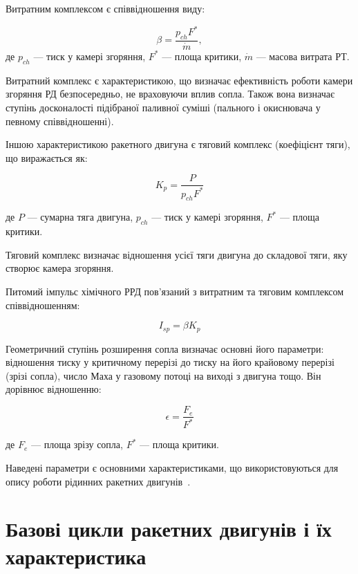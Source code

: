 Витратним комплексом є співвідношення виду:

\begin{equation*}
	\beta = \frac{p_{ch} F^{*}}{\dot{m}},
\end{equation*}
де  $p_{ch}$ ---  тиск у камері згоряння, $F^{*}$ ---  площа критики, $\dot{m}$ --- масова витрата РТ.

Витратний комплекс є характеристикою, що визначає ефективність роботи камери згоряння РД безпосередньо, не враховуючи вплив сопла. Також вона визначає ступінь досконалості підібраної паливної суміші (пального і окиснювача у певному співвідношенні).

Іншою характеристикою ракетного двигуна є тяговий комплекс (коефіцієнт тяги), що виражається як:

\begin{equation*}
K_{p} = \frac{P}{p_{ch} F^{*}}
\end{equation*}

де  $P$ ---  сумарна тяга двигуна, $p_{ch}$ ---  тиск у камері згоряння, $F^{*}$ ---  площа критики.

Тяговий комплекс визначає відношення усієї тяги двигуна до складової тяги, яку створює камера згоряння.

Питомий імпульс хімічного РРД пов'язаний з витратним та тяговим комплексом співвідношенням:

\begin{equation*}
	 I_{sp} = \beta K_{p}
\end{equation*}

Геометричний ступінь розширення сопла визначає основні його параметри: відношення тиску у критичному перерізі до тиску на його крайовому перерізі (зрізі сопла), число Маха у газовому потоці на виході з двигуна тощо. Він дорівнює відношенню:

\begin{equation*}
	\epsilon = \frac{F_{e}}{F^{*}}
\end{equation*}

де  $F_{e}$ ---  площа зрізу сопла, $F^{*}$ ---  площа критики.

Наведені параметри є основними характеристиками, що використовуються для опису роботи рідинних ракетних двигунів~\cite[с. 20 -- 23]{Dobrovolskiy}.
 
 
\section{Базові цикли ракетних двигунів і їх характеристика}

